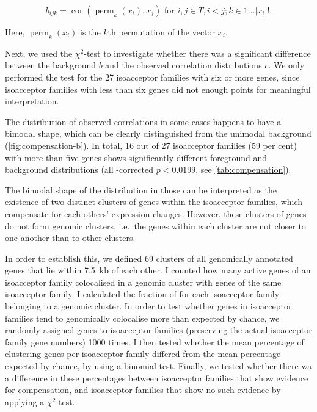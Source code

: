\begin{equation}
    b_{ijk} = \operatorname{cor}(\operatorname{perm}_k(x_i), x_j)
        \text{\ for \(i, j \in T, i < j; k \in 1\dots\lvert x_i\rvert!\)}.
\end{equation}

Here, \(\operatorname{perm}_k(x_i)\) is the \(k\)th permutation of the vector
\(x_i\).

Next, we used the \(\chi^2\)-test to investigate whether there was a significant
difference between the background \(b\) and the observed correlation
distributions \(c\). We only performed the test for the \num{27} isoacceptor
families with six or more genes, since isoacceptor families with less than six
genes did not enough points for meaningful interpretation.

The distribution of observed correlations in some cases happens to have a
bimodal shape, which can be clearly distinguished from the unimodal background
(\cref{fig:compensation-b}). In total, \num{16} out of \num{27} isoacceptor
families (\num{59} per cent) with more than five genes shows significantly
different foreground and background distributions (all \fdr-corrected \(p <
0.0199\), see \cref{tab:compensation}).

The bimodal shape of the distribution in those can be interpreted as the
existence of two distinct clusters of \trna genes within the isoacceptor
families, which compensate for each others’ expression changes. However, these
clusters of genes do not form genomic clusters, i.e.\ the \trna genes within
each cluster are not closer to one another than to other clusters.

In order to establish this, we defined \num{69} clusters of all genomically
annotated \trna genes that lie within \SI{7.5}{kb} of each other. I counted how
many active \trna genes of an isoacceptor family colocalised in a genomic
cluster with \trna genes of the same isoacceptor family. I calculated the
fraction of \trna for each isoacceptor family belonging to a genomic cluster. In
order to test whether genes in isoacceptor families tend to genomically
colocalise more than expected by chance, we randomly assigned \trna genes to
isoacceptor families (preserving the actual isoacceptor family gene numbers)
\num{1000} times. I then tested whether the mean percentage of clustering \trna
genes per isoacceptor family differed from the mean percentage expected by
chance, by using a binomial test. Finally, we tested whether there wa a
difference in these percentages between isoacceptor families that show evidence
for compensation, and isoacceptor families that show no such evidence by
applying a \(\chi^2\)-test.

